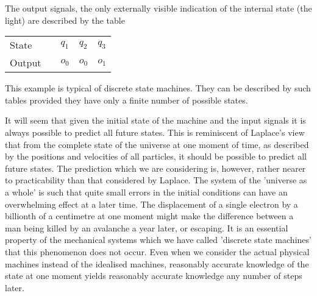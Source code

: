     \noindent
    The output signals, the only externally visible indication of the internal state (the light) are described by the table

    \begin{table}[h!]
        \centering
        \begin{tabular}{lllll}
        State  &  & $q_1$ & $q_2$ & $q_3$ \\
        Output &  & $o_0$ & $o_0$ & $o_1$
        \end{tabular}
    \end{table}

    \noindent
    This example is typical of discrete state machines. They can be described by such tables provided they have only a finite number of possible states.

    It will seem that given the initial state of the machine and the input signals it is always possible to predict all future states. This is reminiscent of Laplace's view that from the complete state of the universe at one moment of time, as described by the positions and velocities of all particles, it should be possible to predict all future states. The prediction which we are considering is, however, rather nearer to practicability than that considered by Laplace. The system of the 'universe as a whole' is such that quite small errors in the initial conditions can have an overwhelming effect at a later time. The displacement of a single electron by a billionth of a centimetre at one moment might make the difference between a man being killed by an avalanche a year later, or escaping. It is an essential property of the mechanical systems which we have called 'discrete state machines' that this phenomenon does not occur. Even when we consider the actual physical machines instead of the idealised machines, reasonably accurate knowledge of the state at one moment yields reasonably accurate knowledge any number of steps later.

